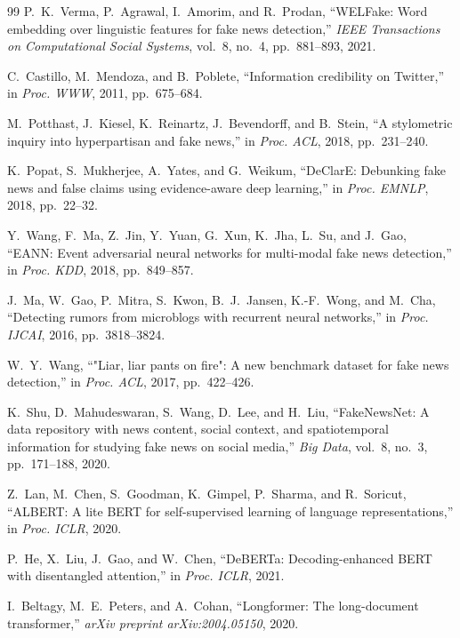 \documentclass[conference]{IEEEtran}
\begin{document}
\begin{thebibliography}{99}
P.~K.~Verma, P.~Agrawal, I.~Amorim, and R.~Prodan, ``WELFake: Word embedding over linguistic features for fake news detection,'' \textit{IEEE Transactions on Computational Social Systems}, vol.~8, no.~4, pp.~881--893, 2021.

C.~Castillo, M.~Mendoza, and B.~Poblete, ``Information credibility on Twitter,'' in \textit{Proc. WWW}, 2011, pp.~675--684.

M.~Potthast, J.~Kiesel, K.~Reinartz, J.~Bevendorff, and B.~Stein, ``A stylometric inquiry into hyperpartisan and fake news,'' in \textit{Proc. ACL}, 2018, pp.~231--240.

K.~Popat, S.~Mukherjee, A.~Yates, and G.~Weikum, ``DeClarE: Debunking fake news and false claims using evidence-aware deep learning,'' in \textit{Proc. EMNLP}, 2018, pp.~22--32.

Y.~Wang, F.~Ma, Z.~Jin, Y.~Yuan, G.~Xun, K.~Jha, L.~Su, and J.~Gao, ``EANN: Event adversarial neural networks for multi-modal fake news detection,'' in \textit{Proc. KDD}, 2018, pp.~849--857.

J.~Ma, W.~Gao, P.~Mitra, S.~Kwon, B.~J.~Jansen, K.-F.~Wong, and M.~Cha, ``Detecting rumors from microblogs with recurrent neural networks,'' in \textit{Proc. IJCAI}, 2016, pp.~3818--3824.

W.~Y.~Wang, ``"Liar, liar pants on fire": A new benchmark dataset for fake news detection,'' in \textit{Proc. ACL}, 2017, pp.~422--426.

K.~Shu, D.~Mahudeswaran, S.~Wang, D.~Lee, and H.~Liu, ``FakeNewsNet: A data repository with news content, social context, and spatiotemporal information for studying fake news on social media,'' \textit{Big Data}, vol.~8, no.~3, pp.~171--188, 2020.

Z.~Lan, M.~Chen, S.~Goodman, K.~Gimpel, P.~Sharma, and R.~Soricut, ``ALBERT: A lite BERT for self-supervised learning of language representations,'' in \textit{Proc. ICLR}, 2020.

P.~He, X.~Liu, J.~Gao, and W.~Chen, ``DeBERTa: Decoding-enhanced BERT with disentangled attention,'' in \textit{Proc. ICLR}, 2021.

I.~Beltagy, M.~E.~Peters, and A.~Cohan, ``Longformer: The long-document transformer,'' \textit{arXiv preprint arXiv:2004.05150}, 2020.


\end{thebibliography}
\end{document}
